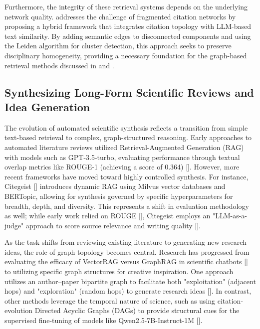 \documentclass[11pt]{article}
\begin{document}
Furthermore, the integrity of these retrieval systems depends on the underlying network quality. \citep{2605.12263} addresses the challenge of fragmented citation networks by proposing a hybrid framework that integrates citation topology with LLM-based text similarity. By adding semantic edges to disconnected components and using the Leiden algorithm for cluster detection, this approach seeks to preserve disciplinary homogeneity, providing a necessary foundation for the graph-based retrieval methods discussed in \citep{2501.15067} and \citep{2409.12177}.

\subsection{Synthesizing Long-Form Scientific Reviews and Idea Generation}

The evolution of automated scientific synthesis reflects a transition from simple text-based retrieval to complex, graph-structured reasoning. Early approaches to automated literature reviews utilized Retrieval-Augmented Generation (RAG) with models such as GPT-3.5-turbo, evaluating performance through textual overlap metrics like ROUGE-1 (achieving a score of 0.364) [\citep{2411.18583}]. However, more recent frameworks have moved toward highly controlled synthesis. For instance, Citegeist [\citep{2503.23229}] introduces dynamic RAG using Milvus vector databases and BERTopic, allowing for synthesis governed by specific hyperparameters for breadth, depth, and diversity. This represents a shift in evaluation methodology as well; while early work relied on ROUGE [\citep{2411.18583}], Citegeist employs an "LLM-as-a-judge" approach to score source relevance and writing quality [\citep{2503.23229}].

As the task shifts from reviewing existing literature to generating new research ideas, the role of graph topology becomes central. Research has progressed from evaluating the efficacy of VectorRAG versus GraphRAG in scientific chatbots [\citep{2602.17856}] to utilizing specific graph structures for creative inspiration. One approach utilizes an author–paper bipartite graph to facilitate both "exploitation" (adjacent hops) and "exploration" (random hops) to generate research ideas [\citep{2602.22215}]. In contrast, other methods leverage the temporal nature of science, such as using citation-evolution Directed Acyclic Graphs (DAGs) to provide structural cues for the supervised fine-tuning of models like Qwen2.5-7B-Instruct-1M [\citep{2605.14790}].
\end{document}
